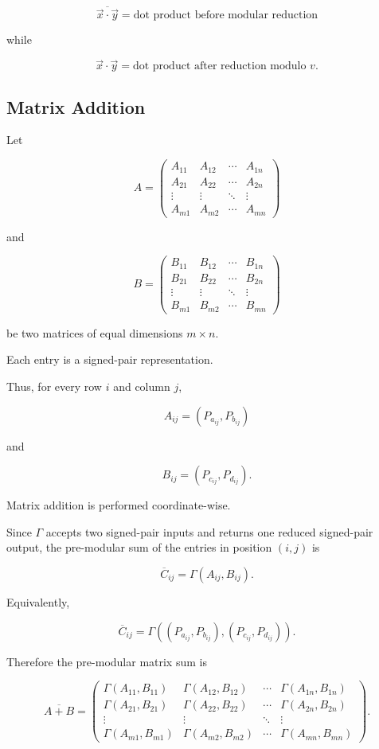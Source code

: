 \documentclass[12pt]{article}
\begin{document}
\[
\boxed{
\overline{\vec{x}\cdot\vec{y}}
=
\text{dot product before modular reduction}
}
\]

while

\[
\boxed{
\vec{x}\cdot\vec{y}
=
\text{dot product after reduction modulo }v.
}
\]
\subsection*{Matrix Addition}

Let

\[
A=
\begin{pmatrix}
A_{11} & A_{12} & \cdots & A_{1n}\\
A_{21} & A_{22} & \cdots & A_{2n}\\
\vdots & \vdots & \ddots & \vdots\\
A_{m1} & A_{m2} & \cdots & A_{mn}
\end{pmatrix}
\]

and

\[
B=
\begin{pmatrix}
B_{11} & B_{12} & \cdots & B_{1n}\\
B_{21} & B_{22} & \cdots & B_{2n}\\
\vdots & \vdots & \ddots & \vdots\\
B_{m1} & B_{m2} & \cdots & B_{mn}
\end{pmatrix}
\]

be two matrices of equal dimensions \(m\times n\).

Each entry is a signed-pair representation.

Thus, for every row \(i\) and column \(j\),

\[
A_{ij}=(P_{a_{ij}},P_{b_{ij}})
\]

and

\[
B_{ij}=(P_{c_{ij}},P_{d_{ij}}).
\]

Matrix addition is performed coordinate-wise.

Since \(\Gamma\) accepts two signed-pair inputs and returns one reduced signed-pair output, the pre-modular sum of the entries in position \((i,j)\) is

\[
\boxed{
\overline{C}_{ij}
=
\Gamma
\left(
A_{ij},
B_{ij}
\right).
}
\]

Equivalently,

\[
\boxed{
\overline{C}_{ij}
=
\Gamma
\left(
(P_{a_{ij}},P_{b_{ij}}),
(P_{c_{ij}},P_{d_{ij}})
\right).
}
\]

Therefore the pre-modular matrix sum is

\[
\boxed{
\overline{A+B}
=
\begin{pmatrix}
\Gamma(A_{11},B_{11}) &
\Gamma(A_{12},B_{12}) &
\cdots &
\Gamma(A_{1n},B_{1n})
\\[6pt]
\Gamma(A_{21},B_{21}) &
\Gamma(A_{22},B_{22}) &
\cdots &
\Gamma(A_{2n},B_{2n})
\\
\vdots & \vdots & \ddots & \vdots
\\
\Gamma(A_{m1},B_{m1}) &
\Gamma(A_{m2},B_{m2}) &
\cdots &
\Gamma(A_{mn},B_{mn})
\end{pmatrix}.
}
\]
\end{document}
